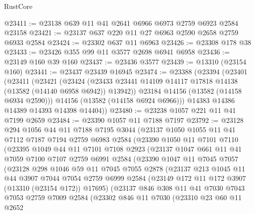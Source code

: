 \begin{lexlean}{RustCore}
\begin{coremodule}
@23411 := @23138 @639 @11 @41 @2641 @6966 @6973 @2759 @6923 @2584 @23158
@23421 := @23137 @637 @220 @11 @27 @6963 @2590 @2658 @2759 @6933 @2584
@23424 := @23302 @637 @11 @6963
@23426 := @23308 @178 @38
@23433 := @23426 @355 @99 @11 @3577 @2698 @6941 @6958
@23436 := @23149 @160 @39 @160
@23437 := @23436 @3577
@23439 := @13310 (@23154 @160)
@23441 := @23437 @23439 @16945
@23474 := @23388
    (@23394
      (@23401
        (@23411
          (@23421
            (@23424
              (@23433 @23441 @14109 @14117 @17818 @14138 (@13582 (@14140 @6958 @6942)) @13942))
            @23184
            @14156
            (@13582 (@14158 @6934 @2590)))
          @14156
          (@13582 (@14158 @6924 @6966)))
        @14383
        @14386
        @14389
        @14393
        @14398
        @14404))
@23480 := @23238 @1057 @221 @11 @41 @7199 @2659
@23484 := @23390 @1057 @11 @7188 @7197
@23792 := @23128
    @294
    @1056
    @44
    @11
    @7188
    @7195
    @3044
    (@23137
      @1050
      @1055
      @11
      @41
      @7112
      @7187
      @7194
      @2759
      @6983
      @2584
      (@23390
        @1050
        @11
        @7101
        @7110
        (@23395
          @1049
          @44
          @11
          @7101
          @7108
          @2923
          (@23137
            @1047
            @661
            @11
            @41
            @7059
            @7100
            @7107
            @2759
            @6991
            @2584
            (@23390
              @1047
              @11
              @7045
              @7057
              (@23128
                @298
                @1046
                @59
                @11
                @7045
                @7055
                @2878
                (@23137
                  @213
                  @1045
                  @11
                  @44
                  @3907
                  @7044
                  @7054
                  @2759
                  @6999
                  @2584
                  (@23149 @172 @11 @172 @3907 (@13310 (@23154 @172)) @17695)
                  (@23137
                    @846
                    @308
                    @11
                    @41
                    @7030
                    @7043
                    @7053
                    @2759
                    @7009
                    @2584
                    (@23302
                      @846
                      @11
                      @7030
                      (@23310
                        @23
                        @60
                        @11
                        @2652

\end{coremodule}
\end{lexlean}
